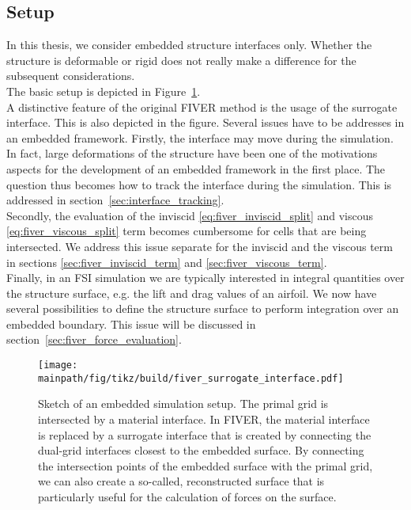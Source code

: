 \documentclass[../main.tex]{subfiles}
\begin{document}
\subsection{Setup}\label{sec:fiver_setup}
In this thesis, we consider embedded structure interfaces only. Whether the structure is deformable or rigid does not really make a difference for the subsequent considerations.\\
The basic setup is depicted in Figure~\ref{fig:FIVER_intersection}.\\
A distinctive feature of the original \ac{FIVER} method is the usage of the surrogate interface. This is also depicted in the figure.
Several issues have to be addresses in an embedded framework. Firstly, the interface may move during the simulation. In fact, large deformations of the structure have been one of the motivations aspects for the development of an embedded framework in the first place. The question thus becomes how to track the interface during the simulation. This is addressed in section~\ref{sec:interface_tracking}.\\
Secondly, the evaluation of the inviscid \eqref{eq:fiver_inviscid_split} and viscous \eqref{eq:fiver_viscous_split} term becomes cumbersome for cells that are being intersected. We address this issue separate for the inviscid and the viscous term in sections \ref{sec:fiver_inviscid_term} and \ref{sec:fiver_viscous_term}.\\
Finally, in an \ac{FSI} simulation we are typically interested in integral quantities over the structure surface, e.g. the lift and drag values of an airfoil. We now have several possibilities to define the structure surface to perform integration over an embedded boundary. This issue will be discussed in section~\ref{sec:fiver_force_evaluation}.

\begin{figure}[h!]
	\begin{center}
        \texttt{[image: \\mainpath/fig/tikz/build/fiver\_surrogate\_interface.pdf]}
        \caption[Immersed boundary method via \ac{FIVER}: setup]{Sketch of an embedded simulation setup. The primal grid is intersected by a material interface. In \ac{FIVER}, the material interface is replaced by a surrogate interface that is created by connecting the dual-grid interfaces closest to the embedded surface. By connecting the intersection points of the embedded surface with the primal grid, we can also create a so-called, reconstructed surface that is particularly useful for the calculation of forces on the surface.}
		\label{fig:FIVER_intersection}
    \end{center}
\end{figure}
\end{document}
